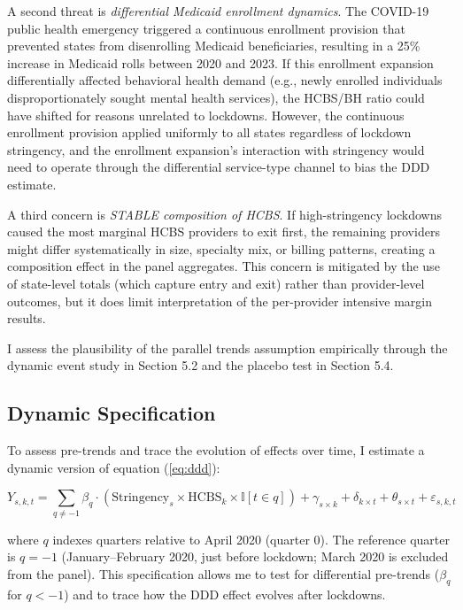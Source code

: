 \documentclass[12pt]{article}
\newcommand{\ind}{\mathbb{I}}
\begin{document}
A second threat is \textit{differential Medicaid enrollment dynamics}. The COVID-19 public health emergency triggered a continuous enrollment provision that prevented states from disenrolling Medicaid beneficiaries, resulting in a 25\% increase in Medicaid rolls between 2020 and 2023. If this enrollment expansion differentially affected behavioral health demand (e.g., newly enrolled individuals disproportionately sought mental health services), the HCBS/BH ratio could have shifted for reasons unrelated to lockdowns. However, the continuous enrollment provision applied uniformly to all states regardless of lockdown stringency, and the enrollment expansion's interaction with stringency would need to operate through the differential service-type channel to bias the DDD estimate.

A third concern is \textit{STABLE composition of HCBS}. If high-stringency lockdowns caused the most marginal HCBS providers to exit first, the remaining providers might differ systematically in size, specialty mix, or billing patterns, creating a composition effect in the panel aggregates. This concern is mitigated by the use of state-level totals (which capture entry and exit) rather than provider-level outcomes, but it does limit interpretation of the per-provider intensive margin results.

I assess the plausibility of the parallel trends assumption empirically through the dynamic event study in Section 5.2 and the placebo test in Section 5.4.

\subsection{Dynamic Specification}

To assess pre-trends and trace the evolution of effects over time, I estimate a dynamic version of equation (\ref{eq:ddd}):

\begin{equation}
Y_{s,k,t} = \sum_{q \neq -1} \beta_q \cdot (\text{Stringency}_s \times \text{HCBS}_k \times \ind[t \in q]) + \gamma_{s \times k} + \delta_{k \times t} + \theta_{s \times t} + \varepsilon_{s,k,t}
\label{eq:dynamic}
\end{equation}

\noindent where $q$ indexes quarters relative to April 2020 (quarter 0). The reference quarter is $q = -1$ (January--February 2020, just before lockdown; March 2020 is excluded from the panel). This specification allows me to test for differential pre-trends ($\beta_q$ for $q < -1$) and to trace how the DDD effect evolves after lockdowns.
\end{document}
